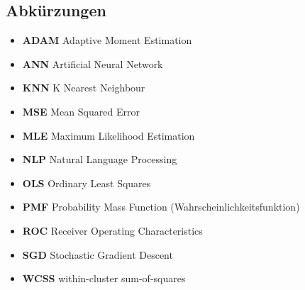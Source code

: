 \subsection*{Abkürzungen}
\begin{itemize}
    \item \textbf{ADAM} Adaptive Moment Estimation
    \item \textbf{ANN} Artificial Neural Network
    \item \textbf{KNN} K Nearest Neighbour
    \item \textbf{MSE} Mean Squared Error
    \item \textbf{MLE} Maximum Likelihood Estimation
    \item \textbf{NLP} Natural Language Processing
    \item \textbf{OLS} Ordinary Least Squares
    \item \textbf{PMF} Probability Mass Function (Wahrscheinlichkeitsfunktion)
    \item \textbf{ROC} Receiver Operating Characteristics
    \item \textbf{SGD} Stochastic Gradient Descent 
    \item \textbf{WCSS} within-cluster sum-of-squares
\end{itemize}

